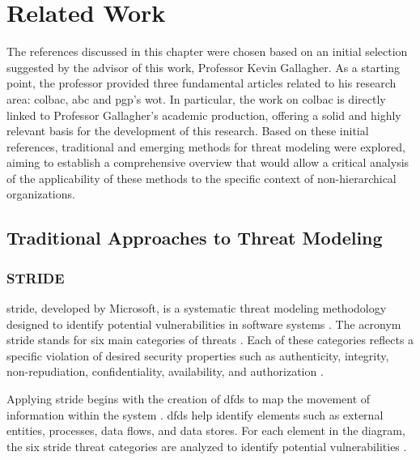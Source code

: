
%

\chapter{Related Work}
\label{cha:related_work}

The references discussed in this chapter were chosen based on an initial
selection suggested by the advisor of this work, Professor Kevin Gallagher. As a
starting point, the professor provided three fundamental articles related to his
research area: \gls{colbac}, \gls{abc} and \gls{pgp}'s \gls{wot}. In particular, the work
on \gls{colbac} is directly linked to Professor Gallagher's academic production,
offering a solid and highly relevant basis for the development of this research.
Based on these initial references, traditional and emerging methods for threat
modeling were explored, aiming to establish a comprehensive overview that would
allow a critical analysis of the applicability of these methods to the specific
context of non-hierarchical organizations.

\glsresetall

\section{Traditional Approaches to Threat Modeling}
\label{sec:traditional_approaches_threat_modeling}

\subsection{STRIDE}
\label{subsec:stride}

\gls{stride}, developed by Microsoft, is a systematic threat modeling
methodology designed to identify potential vulnerabilities in software systems
\cite{MicrosoftThreatModelingTechnique}. The acronym \gls{stride} stands for six
main categories of threats \cite{ThreatModelingdesigningForSecurity}. Each of
these categories reflects a specific violation of desired security properties
such as authenticity, integrity, non-repudiation, confidentiality, availability,
and authorization \cite{MicrosoftThreatModelingTechnique}.

Applying \gls{stride} begins with the creation of \gls{dfds} to map the movement
of information within the system \cite{UncoverSecurityDesignFlawsSTRIDE}.
\gls{dfds} help identify elements such as external entities, processes, data
flows, and data stores. For each element in the diagram, the six \gls{stride}
threat categories are analyzed to identify potential vulnerabilities
\cite{ThreatModelingdesigningForSecurity}.

